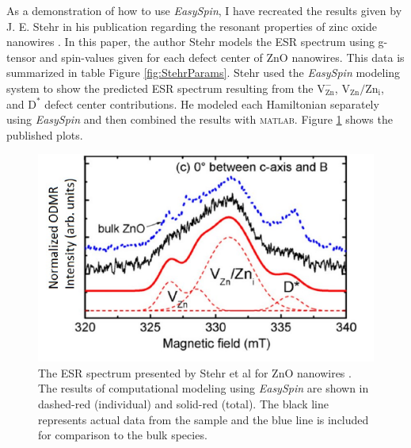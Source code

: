 \documentclass[oneside, noacknowlegments]{BYUPhys}
\begin{document}
As a demonstration of how to use \textit{EasySpin}, I have recreated the results given by J. E. Stehr in his publication regarding the resonant properties of zinc oxide nanowires \cite{RefWorks:doc:58929128e4b0228a292928a7}. In this paper, the author Stehr models the ESR spectrum using g-tensor and spin-values given for each defect center of ZnO nanowires. This data is summarized in table Figure \ref{fig:StehrParams}. Stehr used the \textit{EasySpin} modeling system to show the predicted ESR spectrum resulting from the $\text{V}_{\text{Zn}}^{-}$, $\text{V}_{\text{Zn}}/\text{Zn}_{\text{i}}$, and $\text{D}^{*}$ defect center contributions. He modeled each Hamiltonian separately using \textit{EasySpin} and then combined the results with \textsc{matlab}. Figure \ref{fig:StehrPlots} shows the published plots.

\begin{figure}
    \centerline{\includegraphics{stehr_fig}}
    \caption[ESR Spectrum Presented by Stehr et al.]{\label{fig:StehrPlots}
     The ESR spectrum presented by Stehr et al for ZnO nanowires \cite{RefWorks:doc:58929128e4b0228a292928a7}. The results of computational modeling using \textit{EasySpin} are shown in dashed-red (individual) and solid-red (total). The black line represents actual data from the sample and the blue line is included for comparison to the bulk species.}
 \end{figure}
\end{document}
